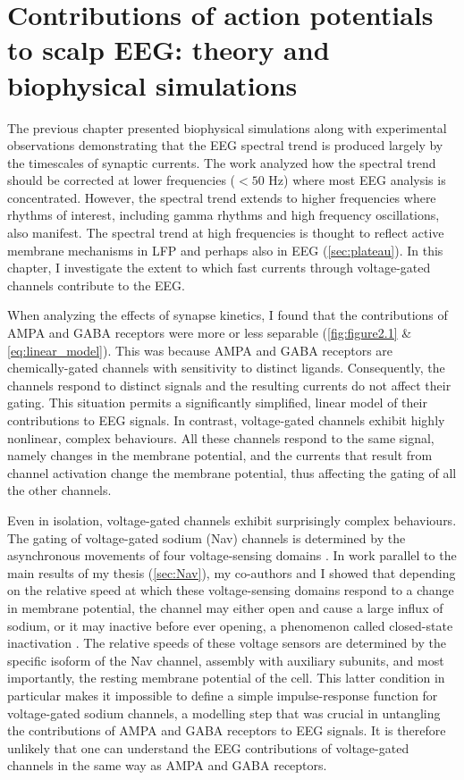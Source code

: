 \chapter{Contributions of action potentials to scalp EEG: theory and biophysical simulations}
\label{sec:apEEG}
\renewcommand{\figurename}{Fig}

The previous chapter presented biophysical simulations along with experimental observations demonstrating that the EEG spectral trend is produced largely by the timescales of synaptic currents. The work analyzed how the spectral trend should be corrected at lower frequencies ($<50$ \unit{\hertz}) where most EEG analysis is concentrated. However, the spectral trend extends to higher frequencies where rhythms of interest, including gamma rhythms and high frequency oscillations, also manifest. The spectral trend at high frequencies is thought to reflect active membrane mechanisms in LFP and perhaps also in EEG (\autoref{sec:plateau}). In this chapter, I investigate the extent to which fast currents through voltage-gated channels contribute to the EEG.

When analyzing the effects of synapse kinetics, I found that the contributions of AMPA and GABA receptors were more or less separable ({\autoref{fig:figure2.1}} \& \ref{eq:linear_model}). This was because AMPA and GABA receptors are chemically-gated channels with sensitivity to distinct ligands. Consequently, the channels respond to distinct signals and the resulting currents do not affect their gating. This situation permits a significantly simplified, linear model of their contributions to EEG signals. In contrast, voltage-gated channels exhibit highly nonlinear, complex behaviours. All these channels respond to the same signal, namely changes in the membrane potential, and the currents that result from channel activation change the membrane potential, thus affecting the gating of all the other channels.

Even in isolation, voltage-gated channels exhibit surprisingly complex behaviours. The gating of voltage-gated sodium (Nav) channels is determined by the asynchronous movements of four voltage-sensing domains \cite{Ahern2016}. In work parallel to the main results of my thesis  (\autoref{sec:Nav}), my co-authors and I showed that depending on the relative speed at which these voltage-sensing domains respond to a change in membrane potential, the channel may either open and cause a large influx of sodium, or it may inactive before ever opening, a phenomenon called closed-state inactivation \cite{Brake2022,Armstrong2006}. The relative speeds of these voltage sensors are determined by the specific isoform of the Nav channel, assembly with auxiliary subunits, and most importantly, the resting membrane potential of the cell. This latter condition in particular makes it impossible to define a simple impulse-response function for voltage-gated sodium channels, a modelling step that was crucial in untangling the contributions of AMPA and GABA receptors to EEG signals. It is therefore unlikely that one can understand the EEG contributions of voltage-gated channels in the same way as AMPA and GABA receptors.

